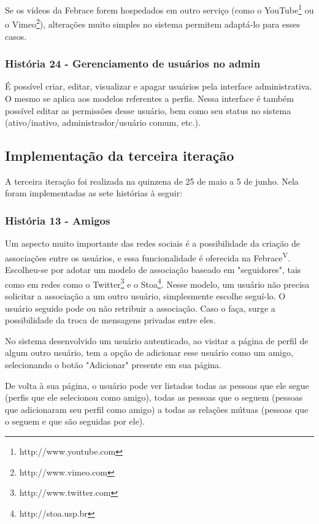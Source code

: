       Se os vídeos da Febrace forem hospedados em outro serviço (como o YouTube\footnote{http://www.youtube.com} ou o Vimeo\footnote{http://www.vimeo.com}), alterações muito simples no sistema permitem adaptá-lo para esses casos.

    \subsubsection{História 24 - Gerenciamento de usuários no admin}
      É possível criar, editar, visualizar e apagar usuários pela interface administrativa. O mesmo se aplica aos modelos referentes a perfis. Nessa interface é também possível editar as permissões desse usuário, bem como seu status no sistema (ativo/inativo, administrador/usuário comum, etc.).

  \subsection{Implementação da terceira iteração}
    A terceira iteração foi realizada na quinzena de 25 de maio a 5 de junho. Nela foram implementadas as sete histórias à seguir:

    \subsubsection{História 13 - Amigos}
      Um aspecto muito importante das redes sociais é a possibilidade da criação de associações entre os usuários, e essa funcionalidade é oferecida na Febrace\textsuperscript{V}. Escolheu-se por adotar um modelo de associação baseado em "seguidores", tais como em redes como o Twitter\footnote{http://www.twitter.com} e o Stoa\footnote{http://stoa.usp.br}. Nesse modelo, um usuário não precisa solicitar a associação a um outro usuário, simplesmente escolhe seguí-lo. O usuário seguido pode ou não retribuir a associação. Caso o faça, surge a possibilidade da troca de mensagens privadas entre eles.

      No sistema desenvolvido um usuário autenticado, ao visitar a página de perfil de algum outro usuário, tem a opção de adicionar esse usuário como um amigo, selecionando o botão "Adicionar" presente em sua página.

      De volta à sua página, o usuário pode ver listados todas as pessoas que ele segue (perfis que ele selecionou como amigo), todas as pessoas que o seguem (pessoas que adicionaram seu perfil como amigo) a todas as relações mútuas (pessoas que o seguem e que são seguidas por ele).

